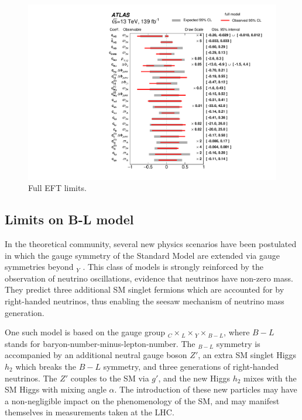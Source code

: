 \begin{figure}
    \centering
    \includegraphics[width=\mediumfigwidth]{Figures/m4l/Interpretations/EFTLimits_MVozak.pdf}
    \caption{Full EFT limits.}
    \label{fig:EFTfull}
\end{figure}

\subsection{Limits on B-L model}
\label{ssec:m4l:BL}

In the theoretical community, several new physics scenarios have been postulated in which the gauge symmetry of the Standard Model are extended via  gauge symmetries beyond $_Y$ \cite{}. This class of models is strongly reinforced by the observation of neutrino oscillations, evidence that neutrinos have non-zero mass. They predict three additional SM singlet fermions which are accounted for by right-handed neutrinos, thus enabling the seesaw mechanism of neutrino mass generation. 

One such model is based on the gauge group $_C\times$$_L\times$$_Y\times$$_{B-L}$, where $B-L$ stands for baryon-number-minus-lepton-number. The $_{B-L}$ symmetry is accompanied by an additional neutral gauge boson $Z'$, an extra SM singlet Higgs $h_2$ which breaks the $B-L$ symmetry, and three generations of right-handed neutrinos. The $Z'$ couples to the SM via $g'$, and the new Higgs $h_2$ mixes with the SM Higgs with mixing angle $\alpha$. The introduction of these new particles may have a non-negligible impact on the phenomenology of the SM, and may manifest themselves in measurements taken at the LHC. 


